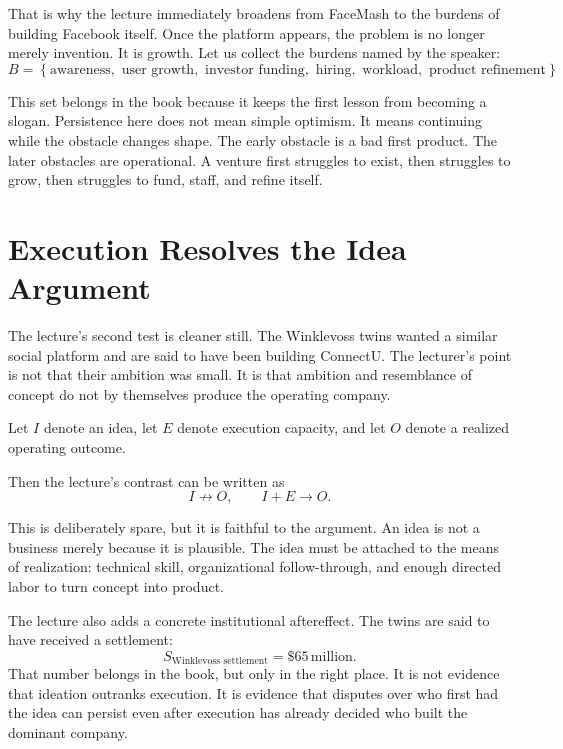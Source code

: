 \documentclass[11pt,oneside]{book}
\begin{document}
That is why the lecture immediately broadens from FaceMash to the burdens of building Facebook itself. Once the platform appears, the problem is no longer merely invention. It is growth. Let us collect the burdens named by the speaker:
\begin{equation}
B
=
\left\{
\text{awareness},
\text{ user growth},
\text{ investor funding},
\text{ hiring},
\text{ workload},
\text{ product refinement}
\right\}.
\end{equation}

This set belongs in the book because it keeps the first lesson from becoming a slogan. Persistence here does not mean simple optimism. It means continuing while the obstacle changes shape. The early obstacle is a bad first product. The later obstacles are operational. A venture first struggles to exist, then struggles to grow, then struggles to fund, staff, and refine itself.

\section{Execution Resolves the Idea Argument}

The lecture's second test is cleaner still. The Winklevoss twins wanted a similar social platform and are said to have been building ConnectU. The lecturer's point is not that their ambition was small. It is that ambition and resemblance of concept do not by themselves produce the operating company.

\begin{definition}
Let \(I\) denote an idea, let \(E\) denote execution capacity, and let \(O\) denote a realized operating outcome.
\end{definition}

Then the lecture's contrast can be written as
\begin{equation}
I \not\longrightarrow O,
\qquad
I + E \longrightarrow O.
\end{equation}

This is deliberately spare, but it is faithful to the argument. An idea is not a business merely because it is plausible. The idea must be attached to the means of realization: technical skill, organizational follow-through, and enough directed labor to turn concept into product.

The lecture also adds a concrete institutional aftereffect. The twins are said to have received a settlement:
\begin{equation}
S_{\text{Winklevoss settlement}} = \$65\,\text{million}.
\end{equation}
That number belongs in the book, but only in the right place. It is not evidence that ideation outranks execution. It is evidence that disputes over who first had the idea can persist even after execution has already decided who built the dominant company.
\end{document}
